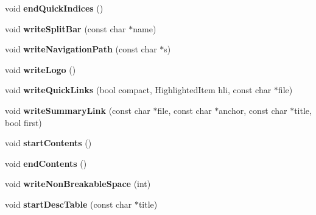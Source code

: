 \begin{DoxyCompactItemize}
\item 
\hypertarget{class_html_generator_a8ccfa7b4cc697673db66d95470901da6}{void {\bfseries end\-Quick\-Indices} ()}\label{class_html_generator_a8ccfa7b4cc697673db66d95470901da6}

\item 
\hypertarget{class_html_generator_aa08d5576403aaf7dbdadd40cfdd2ccd7}{void {\bfseries write\-Split\-Bar} (const char $\ast$name)}\label{class_html_generator_aa08d5576403aaf7dbdadd40cfdd2ccd7}

\item 
\hypertarget{class_html_generator_a73bd5b677298d5d38c3adeee45889d82}{void {\bfseries write\-Navigation\-Path} (const char $\ast$s)}\label{class_html_generator_a73bd5b677298d5d38c3adeee45889d82}

\item 
\hypertarget{class_html_generator_ac7d0ac7d2abfeba04c9c22a3974221ae}{void {\bfseries write\-Logo} ()}\label{class_html_generator_ac7d0ac7d2abfeba04c9c22a3974221ae}

\item 
\hypertarget{class_html_generator_aaabc3321e0f41d7c76fc03bfb77ca26a}{void {\bfseries write\-Quick\-Links} (bool compact, Highlighted\-Item hli, const char $\ast$file)}\label{class_html_generator_aaabc3321e0f41d7c76fc03bfb77ca26a}

\item 
\hypertarget{class_html_generator_a365f727475781694161eeed7a18c650d}{void {\bfseries write\-Summary\-Link} (const char $\ast$file, const char $\ast$anchor, const char $\ast$title, bool first)}\label{class_html_generator_a365f727475781694161eeed7a18c650d}

\item 
\hypertarget{class_html_generator_a4d02a081921a34660b9f11e7c32a303f}{void {\bfseries start\-Contents} ()}\label{class_html_generator_a4d02a081921a34660b9f11e7c32a303f}

\item 
\hypertarget{class_html_generator_a89af32c9958f2fc61301a25e7b3360c7}{void {\bfseries end\-Contents} ()}\label{class_html_generator_a89af32c9958f2fc61301a25e7b3360c7}

\item 
\hypertarget{class_html_generator_a7c7ac7747fa458bcc89aa71c0764459b}{void {\bfseries write\-Non\-Breakable\-Space} (int)}\label{class_html_generator_a7c7ac7747fa458bcc89aa71c0764459b}

\item 
\hypertarget{class_html_generator_a6f7fc449c9d4d715c169881f1a54eea2}{void {\bfseries start\-Desc\-Table} (const char $\ast$title)}\label{class_html_generator_a6f7fc449c9d4d715c169881f1a54eea2}


\end{DoxyCompactItemize}
